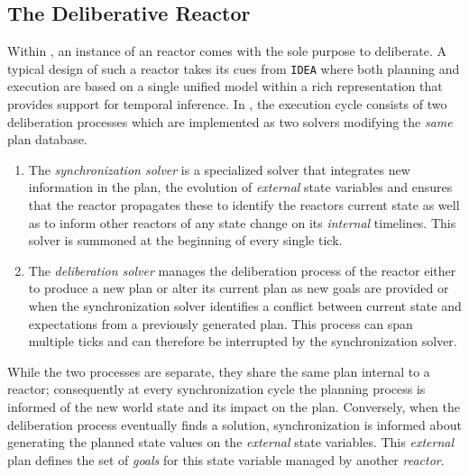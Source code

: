 \subsection{The  \eu Deliberative Reactor}
\label{sec:arch:europa}

Within \rx, an instance of an \eu reactor comes with the sole purpose
to deliberate. A typical design of such a reactor takes its cues from
\texttt{IDEA} \cite{mus02, mus06} where both planning and execution
are based on a single unified model within a rich representation that
provides support for temporal inference. In \rx, the execution cycle
consists of two deliberation processes which are implemented as two
\eu solvers modifying the \emph{same} plan database. %

\begin{enumerate}

\item The \emph{synchronization solver} is a specialized \eu solver
  that integrates new information in the plan, the evolution of
  \emph{external} state variables and ensures that the reactor
  propagates these to identify the reactors current state as well as
  to inform other reactors of any state change on its \emph{internal}
  timelines. This solver is summoned at the beginning of every single
  tick.

\item The \emph{deliberation solver} manages the deliberation process
  of the reactor either to produce a new plan or alter its current
  plan as new goals are provided or when the synchronization solver
  identifies a conflict between current state and expectations from a
  previously generated plan. This process can span multiple ticks and
  can therefore be interrupted by the synchronization solver.

\end{enumerate}

While the two processes are separate, they share the same plan
internal to a reactor; consequently at every synchronization cycle the
planning process is informed of the new world state and its impact on
the plan. Conversely, when the deliberation process eventually finds a
solution, synchronization is informed about generating the planned
state values  on the {\em external} state
variables. This {\em external} plan defines the set of {\em goals} for
this state variable managed by another {\em reactor}.


